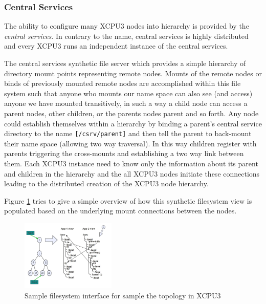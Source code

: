 \subsubsection{Central Services}

The ability to configure many XCPU3 nodes into hierarchy is provided by the
\textit{central services}.  In contrary to the name, central services is
highly distributed and every XCPU3 runs an independent instance of the central
services.  


The central services synthetic file server which provides a simple hierarchy of
directory mount points representing remote nodes.  Mounts of the remote nodes
or binds of previously mounted remote nodes are accomplished within this file
system such that anyone who mounts our name space can also see (and
access) anyone we have mounted transitively,  in such a way a child
node can access a parent nodes, other children, or the parents nodes
parent and so forth. Any node could establish themselves within a
hierarchy by binding a parent's central service directory to the name
\texttt{[/csrv/parent]} and then tell the parent to back-mount their name space
(allowing two way traversal).  In this way children register with parents
triggering the cross-mounts and establishing a two way link between them. Each
XCPU3 instance need to know only the information about its parent and children
in the hierarchy and the all XCPU3 nodes initiate these connections leading to
the distributed creation of the XCPU3 node hierarchy.
 
Figure \ref{fig:xcpu3FSTopo} tries to give a simple overview of how this 
synthetic filesystem view is populated based on the underlying mount
connections between the nodes.

\begin{figure}[h]
  \begin{center}
    \leavevmode
      \includegraphics[height=0.3\textheight,width=0.4\textwidth]
		{./img/xcpu3FSTopo}
    \caption{Sample filesystem interface for sample the topology in XCPU3}
    \label{fig:xcpu3FSTopo}
  \end{center}
\end{figure}

